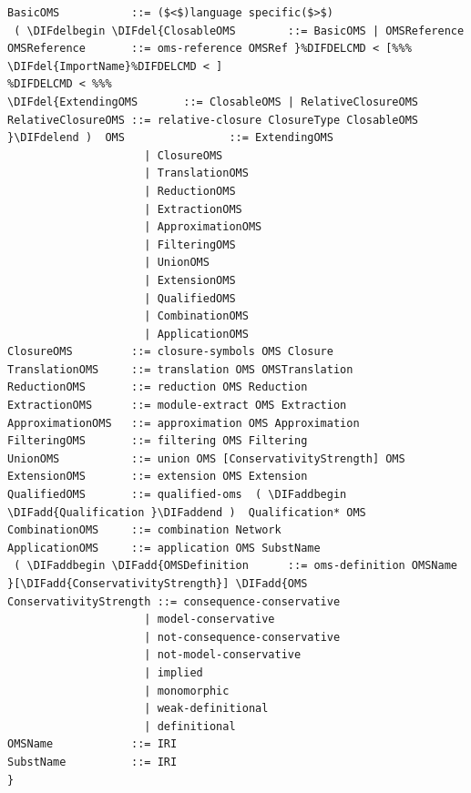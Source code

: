 \documentclass[10pt,fleqn,final]{scrreprt}
\newenvironment{definitions}[0]{\medskip }{}
\providecommand{\DIFadd}[1]{{\protect\color{blue}\uwave{#1}}} %
\providecommand{\DIFdel}[1]{{\protect\color{red}\sout{#1}}}                      %
\providecommand{\DIFaddbegin}{} %
\providecommand{\DIFaddend}{} %
\providecommand{\DIFdelbegin}{} %
\providecommand{\DIFdelend}{} %
\begin{document}
\begin{definitions}
\begin{lstlisting}[language=ebnf,escapeinside={()}]
BasicOMS           ::= ($<$)language specific($>$) 
 ( \DIFdelbegin \DIFdel{ClosableOMS        ::= BasicOMS | OMSReference
OMSReference       ::= oms-reference OMSRef }%DIFDELCMD < [%%%
\DIFdel{ImportName}%DIFDELCMD < ]
%DIFDELCMD < %%%
\DIFdel{ExtendingOMS       ::= ClosableOMS | RelativeClosureOMS
RelativeClosureOMS ::= relative-closure ClosureType ClosableOMS
}\DIFdelend )  OMS                ::= ExtendingOMS
                     | ClosureOMS
                     | TranslationOMS
                     | ReductionOMS
                     | ExtractionOMS
                     | ApproximationOMS
                     | FilteringOMS
                     | UnionOMS
                     | ExtensionOMS
                     | QualifiedOMS
                     | CombinationOMS
                     | ApplicationOMS
ClosureOMS         ::= closure-symbols OMS Closure
TranslationOMS     ::= translation OMS OMSTranslation
ReductionOMS       ::= reduction OMS Reduction
ExtractionOMS      ::= module-extract OMS Extraction
ApproximationOMS   ::= approximation OMS Approximation
FilteringOMS       ::= filtering OMS Filtering
UnionOMS           ::= union OMS [ConservativityStrength] OMS
ExtensionOMS       ::= extension OMS Extension
QualifiedOMS       ::= qualified-oms  ( \DIFaddbegin \DIFadd{Qualification }\DIFaddend )  Qualification* OMS
CombinationOMS     ::= combination Network
ApplicationOMS     ::= application OMS SubstName
 ( \DIFaddbegin \DIFadd{OMSDefinition      ::= oms-definition OMSName }[\DIFadd{ConservativityStrength}] \DIFadd{OMS
ConservativityStrength ::= consequence-conservative
                     | model-conservative
                     | not-consequence-conservative
                     | not-model-conservative
                     | implied
                     | monomorphic
                     | weak-definitional
                     | definitional
OMSName            ::= IRI
SubstName          ::= IRI
}\end{lstlisting}


\end{definitions}
\end{document}
